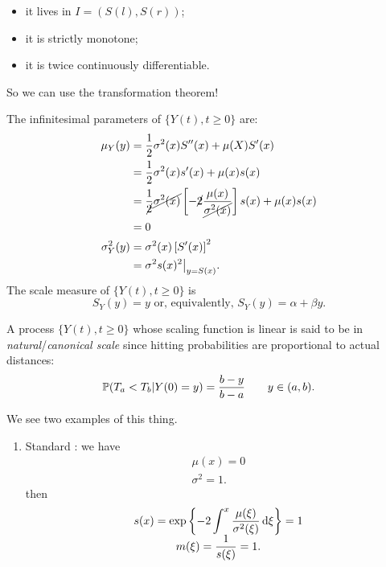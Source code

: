 \documentclass[12pt]{report}
\begin{document}
\begin{enumerate}[\bfseries A:]
\begin{itemize}
\begin{itemize}
			\item it lives in $I=(S(l), S(r))$;
			\item it is strictly monotone;
			\item it is twice continuously differentiable.
		\end{itemize}
		So we can use the transformation theorem!
	\end{itemize}
	The infinitesimal parameters of $\{Y(t),t\geq0\}$ are:
	\begin{align*}
		\mu_{Y}(y)&=\frac{1}{2}\sigma^{2}(x)S''(x)+\mu(X)S'(x)\\
		&=\frac{1}{2}\sigma^{2}(x)s'(x)+\mu(x)s(x)\\
		&=\frac{1}{\cancel{2}}\cancel{\sigma^{2}(x)}\left[-\cancel{2}\frac{\mu(x)}{\cancel{\sigma^{2}(x)}}\right]s(x)+\mu(x)s(x)\\
		&=0\\
		\sigma^{2}_{Y}(y)&=\sigma^{2}(x)\left[S'(x)\right]^{2}\\
		&=\sigma^{2}s(x)^{2}\big|_{y=S(x)}.
	\end{align*}
	The scale measure of $\{Y(t),t\geq0\}$ is
	\begin{equation*}
		S_{Y}(y)=y\text{ or, equivalently, }S_{Y}(y)=\alpha+\beta y.
	\end{equation*}
	\begin{definition}
		A process $\{Y(t),t\geq 0\}$ whose scaling function is linear is said to be in \emph{natural}/\emph{canonical scale} since hitting probabilities are proportional to actual distances:
		\begin{equation*}
			\mathbb{P}(T_{a}<T_{b}|Y(0)=y)=\frac{b-y}{b-a}\qquad y\in(a,b).
		\end{equation*}
	\end{definition}
	We see two examples of this thing.
	\begin{enumerate}[\circlet]
		\item Standard \bwm: we have
		\begin{equation*}
			\begin{array}{c}
				\mu(x)=0\\
				\sigma^{2}=1.
			\end{array}
		\end{equation*}
		then
		\begin{equation*}
			\begin{array}{>{\displaystyle}c}
				s(x)=\expg{-2\int^{x}\frac{\mu(\xi)}{\sigma^{2}(\xi)}\dif\xi}=1\\
			m(\xi)=\frac{1}{s(\xi)}=1.
			\end{array}

\end{equation*}
\end{enumerate}
\end{enumerate}
\end{document}
